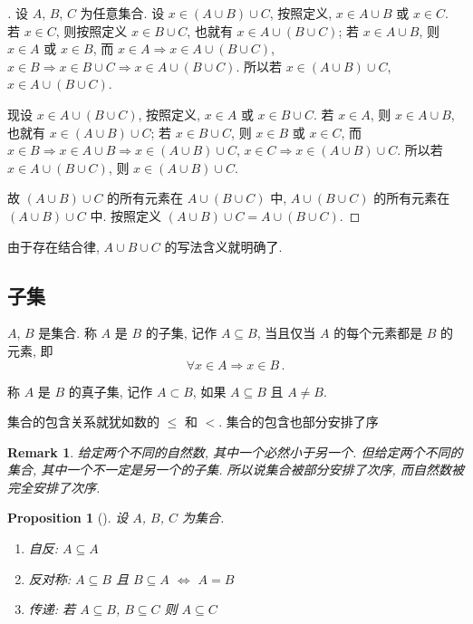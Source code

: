 \documentclass[UTF8]{ctexart}
\theoremstyle{mystyle}
\newtheorem{proposition}{Proposition}[section]
\theoremstyle{myremark}
\newtheorem*{remark}{Remark}
\theoremstyle{plain}
\begin{document}
\begin{proof}[]
    设 $ A $, $ B $, $ C $ 为任意集合. 设 $ x \in (A \cup B) \cup C $, 按照定义, $ x \in A \cup B $ 或 $ x \in C $. 若 $ x \in C $, 则按照定义 $ x \in B \cup C $, 也就有 $ x \in A \cup (B \cup C) $; 若 $ x \in A \cup B $, 则 $ x \in A $ 或 $ x \in B $, 而 $ x \in A \Longrightarrow x \in A \cup (B \cup C) $, $ x \in B \Longrightarrow x \in B \cup C \Longrightarrow x \in A \cup (B \cup C) $. 所以若 $ x \in (A \cup B) \cup C $, $ x \in A \cup (B \cup C) $.

    现设 $ x \in A \cup (B \cup C) $, 按照定义, $ x \in A $ 或 $ x \in B \cup C $. 若 $ x \in A $, 则 $ x \in A \cup B $, 也就有 $ x \in (A \cup B) \cup C $; 若 $ x \in B \cup C $, 则 $ x \in B $ 或 $ x \in C $, 而 $ x \in B \Longrightarrow x \in A \cup B \Longrightarrow x \in (A \cup B) \cup C $, $ x \in C \Longrightarrow x \in (A \cup B) \cup C $. 所以若 $ x \in A \cup (B \cup C) $, 则 $ x \in (A \cup B) \cup C $.

    故 $ (A \cup B) \cup C $ 的所有元素在 $ A \cup (B \cup C) $ 中, $ A \cup (B \cup C) $ 的所有元素在 $ (A \cup B) \cup C $ 中. 按照定义 $ (A \cup B) \cup C = A \cup (B \cup C) $.
\end{proof}

由于存在结合律, $ A \cup B \cup C $ 的写法含义就明确了.


\subsection{子集}
\begin{definition}[\text{子集}]
    $ A $, $ B $ 是集合. 称 $ A $ 是 $ B $ 的子集, 记作 $ A \subseteq B $, 当且仅当 $ A $ 的每个元素都是 $ B $ 的元素, 即 \[ \forall x \in A \Longrightarrow x \in B \,.\]

    称 $ A $ 是 $ B $ 的真子集, 记作 $ A \subset B $, 如果 $ A \subseteq B $ 且 $ A \neq B $. 
\end{definition}

集合的包含关系就犹如数的 $ \leqslant $ 和 $ < $. 集合的包含也部分安排了序

\begin{remark}
    给定两个不同的自然数, 其中一个必然小于另一个. 但给定两个不同的集合, 其中一个不一定是另一个的子集. 所以说集合被部分安排了次序, 而自然数被完全安排了次序.
\end{remark}

\begin{proposition}[]
    设 $ A $, $ B $, $ C $ 为集合. 
    \begin{enumerate}
        \item 自反: $ A \subseteq A $
        \item 反对称: $ A \subseteq B $ 且 $ B \subseteq A $ $ \Longleftrightarrow $ $ A = B $
        \item 传递: 若 $ A \subseteq B $, $ B \subseteq C $ 则 $ A \subseteq C $
    \end{enumerate}
\end{proposition}
\end{document}

